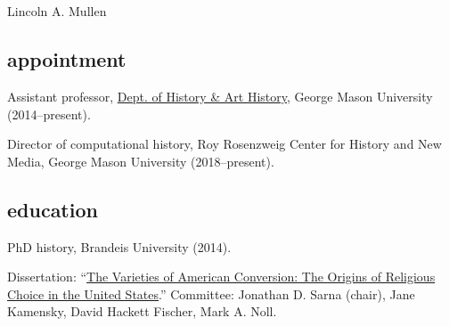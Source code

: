 \documentclass[11pt]{article}
\begin{document}
\thispagestyle{fancy}
\fancyfoot{}
\fancyhead{}
\renewcommand{\headrulewidth}{0pt}

\hfill\hfill\hfill
\hfill\hfill\hfill
\hfill\hfill\hfill
\hfill\hfill\hfill
\begin{minipage}[t]{1.6in}
   \\
   \\
\end{minipage}
\hfill
\begin{minipage}[t]{1.9in}
\end{minipage}

\vspace{0.1in}

{\Large Lincoln A. Mullen}\\[-0.1in]

\subsection{appointment}\label{appointment}

Assistant professor, \href{http://historyarthistory.gmu.edu/}{Dept.
  of History \& Art History}, George Mason University (2014--present).

Director of computational history, Roy Rosenzweig Center for History and New Media, George 
Mason University (2018--present).

\subsection{education}\label{education}

PhD history, Brandeis University (2014). 

\hfill\begin{minipage}{6.25in}

  Dissertation: ``\href{/research/\#dissertation}{The Varieties of American 
    Conversion: The Origins of Religious Choice in the United States}.''
    Committee: Jonathan D. Sarna (chair), Jane Kamensky, David Hackett Fischer, 
  Mark A. Noll.

\end{minipage}
\end{document}
